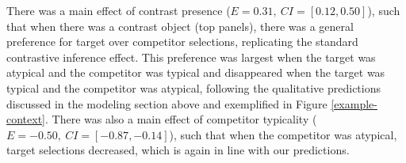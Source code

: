 \documentclass[10pt,letterpaper]{article}
\newcommand{\jd}[1]{\textcolor{Purple}{[jd: #1]}}
\newcommand{\figref}[1]{Figure \ref{#1}}
\begin{document}
There was a main effect of contrast presence ($E=0.31,\ CI=[0.12,0.50]$), such that when there was a contrast object (top panels), there was a general preference for target over competitor selections, replicating the standard contrastive inference effect. This preference was largest when the target was atypical and the competitor was typical and disappeared when the target was typical and the competitor was atypical, following the qualitative predictions discussed in the modeling section above and exemplified in \figref{example-context}. There was also a main effect of competitor typicality ($E=-0.50,\ CI=[-0.87,-0.14]$), such that when the competitor was atypical, target selections decreased, which is again in line with our predictions.




\end{document}
